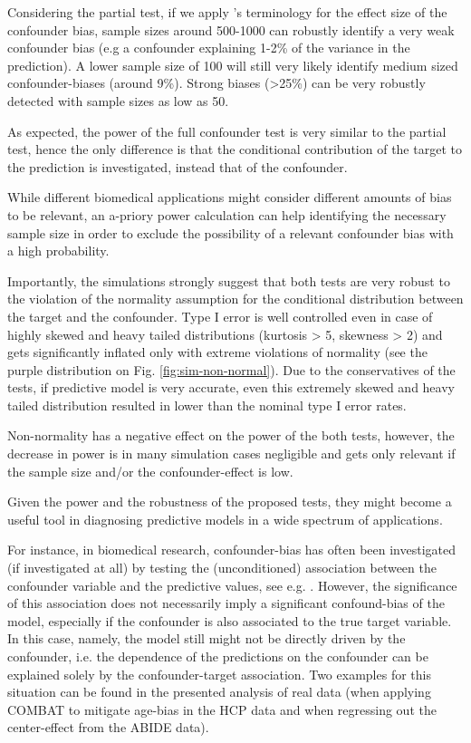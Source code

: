\documentclass{article}
\begin{document}
Considering the partial test, if we apply \citeauthor{cohen2013statistical}'s terminology for the effect size of the confounder bias, sample sizes around 500-1000 can robustly identify a very weak confounder bias (e.g a confounder explaining 1-2\% of the variance in the prediction). A lower sample size of 100 will still very likely identify medium sized confounder-biases (around 9\%). Strong biases  (>25\%) can be very robustly detected with sample sizes as low as 50. 

As expected, the power of the full confounder test is very similar to the partial test, hence the only difference is that the conditional contribution of the target to the prediction is investigated, instead that of the confounder.

While different biomedical applications might consider different amounts of bias to be relevant, an a-priory power calculation can help identifying the necessary sample size in order to exclude the possibility of a relevant confounder bias with a high probability.

Importantly, the simulations strongly suggest that both tests are very robust to the violation of the normality assumption for the conditional distribution between the target and the confounder. Type I error is well controlled even in case of highly skewed and heavy tailed distributions (kurtosis > 5, skewness > 2) and gets significantly inflated only with extreme violations of normality (see the purple distribution on Fig. \ref{fig:sim-non-normal}). Due to the conservatives of the tests, if predictive model is very accurate, even this extremely skewed and heavy tailed distribution resulted in lower than the nominal type I error rates.

Non-normality has a negative effect on the power of the both tests, however, the decrease in power is in many simulation cases negligible and gets only relevant if the sample size and/or the confounder-effect is low.

Given the power and the robustness of the proposed tests, they might become a useful tool in diagnosing predictive models in a wide spectrum of applications.

For instance, in biomedical research, confounder-bias has often been investigated (if investigated at all) by testing the (unconditioned) association between the confounder variable and the predictive values, see e.g. \citep{spisak2020pain}.
However, the significance of this association does not necessarily imply a significant confound-bias of the model, especially if the confounder is also associated to the true target variable. In this case, namely, the model still might not be directly driven by the confounder, i.e. the dependence of the predictions on the confounder can be explained solely by the confounder-target association. 
Two examples for this situation can be found in the presented analysis of real data (when applying COMBAT to mitigate age-bias in the HCP data and when regressing out the center-effect from the ABIDE data).
\end{document}
